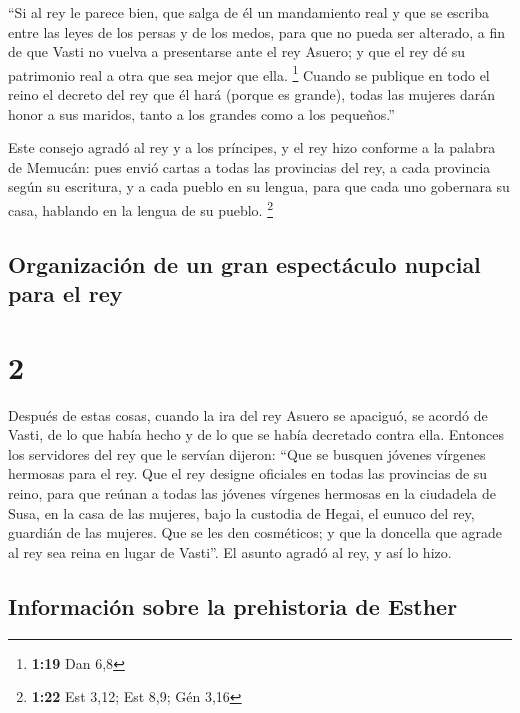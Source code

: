  ``Si al rey le parece bien, que salga de él un
mandamiento real y que se escriba entre las leyes de los persas y de los
medos, para que no pueda ser alterado, a fin de que Vasti no vuelva a
presentarse ante el rey Asuero; y que el rey dé su patrimonio real a
otra que sea mejor que ella. \footnote{\textbf{1:19} Dan 6,8}
 Cuando se publique en todo el reino el decreto del rey
que él hará (porque es grande), todas las mujeres darán honor a sus
maridos, tanto a los grandes como a los pequeños.''

 Este consejo agradó al rey y a los príncipes, y el rey
hizo conforme a la palabra de Memucán:  pues envió cartas
a todas las provincias del rey, a cada provincia según su escritura, y a
cada pueblo en su lengua, para que cada uno gobernara su casa, hablando
en la lengua de su pueblo. \footnote{\textbf{1:22} Est 3,12; Est 8,9;
  Gén 3,16}

\hypertarget{organizaciuxf3n-de-un-gran-espectuxe1culo-nupcial-para-el-rey}{%
\subsection{Organización de un gran espectáculo nupcial para el
rey}\label{organizaciuxf3n-de-un-gran-espectuxe1culo-nupcial-para-el-rey}}

\hypertarget{section-1}{%
\section{2}\label{section-1}}

 Después de estas cosas, cuando la ira del rey Asuero se
apaciguó, se acordó de Vasti, de lo que había hecho y de lo que se había
decretado contra ella.  Entonces los servidores del rey
que le servían dijeron: ``Que se busquen jóvenes vírgenes hermosas para
el rey.  Que el rey designe oficiales en todas las
provincias de su reino, para que reúnan a todas las jóvenes vírgenes
hermosas en la ciudadela de Susa, en la casa de las mujeres, bajo la
custodia de Hegai, el eunuco del rey, guardián de las mujeres. Que se
les den cosméticos;  y que la doncella que agrade al rey
sea reina en lugar de Vasti''. El asunto agradó al rey, y así lo hizo.

\hypertarget{informaciuxf3n-sobre-la-prehistoria-de-esther}{%
\subsection{Información sobre la prehistoria de
Esther}\label{informaciuxf3n-sobre-la-prehistoria-de-esther}}

